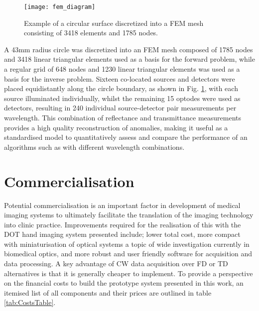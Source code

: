\documentclass[twoside]{bhamthesis}
\theoremstyle{definition}
\begin{document}
\label{appendix:Standardised_Circular_Model}

\begin{figure}[!ht]
  \centering
  \texttt{[image: fem\_diagram]}
\caption{Example of a circular surface discretized into a FEM mesh consisting of 3418 elements and 1785 nodes.}
\label{fig:FEM_cylinder}
\end{figure}

A 43mm radius circle was discretized into an FEM mesh composed of 1785 nodes and 3418 linear triangular elements used as a basis for the forward problem, while a regular grid of 648 nodes and 1230 linear triangular elements was used as a basis for the inverse problem. Sixteen co-located sources and detectors were placed equidistantly along the circle boundary, as shown in Fig. \ref{fig:FEM_cylinder}, with each source illuminated individually, whilst the remaining 15 optodes were used as detectors, resulting in 240 individual source-detector pair measurements per wavelength. This combination of reflectance and transmittance measurements provides a high quality reconstruction of anomalies, making it useful as a standardised model to quantitatively assess and compare the performance of an algorithms such as with different wavelength combinations.

\section{Commercialisation}

\label{Commercialisation}

Potential commercialisation is an important factor in development of medical imaging systems to ultimately facilitate the translation of the imaging technology into clinic practice. Improvements required for the realisation of this with the DOT hand imaging system presented include; lower total cost, more compact with miniaturisation of optical systems a topic of wide investigation currently in biomedical optics, and more robust and user friendly software for acquisition and data processing. A key advantage of CW data acquisition over FD or TD alternatives is that it is generally cheaper to implement. To provide a perspective on the financial costs to build the prototype system presented in this work, an itemised list of all components and their prices are outlined in table \ref{tab:CostsTable}.
\end{document}
